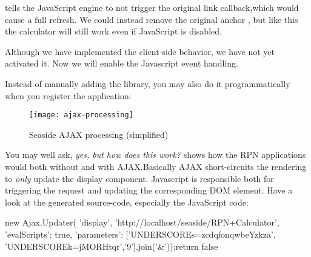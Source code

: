 \documentclass[a4paper,10pt,twoside]{book}
\begin{document}
 tells the JavaScript engine to not trigger the original link callback,which would cause a full refresh.
We could instead remove the original anchor , but like this the calculator
will still work even if JavaScript is disabled.


Although we have implemented the client-side behavior, we have not yet activated it.
Now we will enable the Javascript event handling.


Instead of manually adding the library, you may also do it programmatically when you
register the application:
\begin{code}{}
MyCalculator class>>>initialize
	(self registerAsApplication: 'rpn')
		addLibrary: SULibrary}}
\end{code}

\begin{figure}[ht]
\begin{center}
\texttt{[image: ajax-processing]}
\caption{Seaside AJAX processing (simplified)}
\end{center}
\end{figure}


You may well ask, \emph{yes, but how does this work?}
 shows how the RPN applications would both without and with
AJAX.Basically AJAX short-circuits the rendering to \emph{only} update the display
component.
Javascript is responsible both for triggering the request and updating the corresponding
DOM element.
Have a look at the generated source-code, especially the JavaScript code:

\begin{code}{}
new Ajax.Updater(
	'display',
	'http://localhost/seaside/RPN+Calculator',
	{'evalScripts': true,
'parameters': ['UNDERSCOREs=zcdqfonqwbeYzkza',
'UNDERSCOREk=jMORHtqr','9'].join('&')});return false
\end{code}
\end{document}
